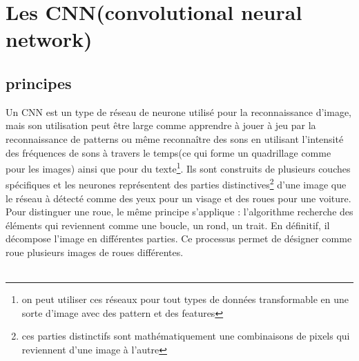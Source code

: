 \documentclass[openany,14pt,fleqn]{book} %
\begin{document}
\chapter{Les CNN(convolutional neural network)}
\section{principes}
Un CNN est un type de réseau de neurone utilisé pour la reconnaissance d'image, mais son utilisation peut être large comme apprendre à jouer à jeu par la reconnaissance de patterns ou même reconnaître des sons en utilisant l'intensité des fréquences de sons à travers le temps(ce qui forme un quadrillage comme pour les images) ainsi que pour du texte\footnote{on peut utiliser ces réseaux pour tout types de données transformable en une sorte d'image avec des pattern et des features}. Ils sont construits de plusieurs couches spécifiques et les neurones représentent des parties distinctives\footnote{ces parties distinctifs sont mathématiquement une combinaisons de pixels qui reviennent d'une image à l'autre} d'une image que le réseau à détecté comme des yeux pour un visage et des roues pour une voiture. Pour distinguer une roue, le même principe s'applique : l'algorithme recherche des éléments qui reviennent comme une boucle, un rond, un trait. En définitif, il décompose l'image en différentes parties. Ce processus permet de désigner comme roue plusieurs images de roues différentes.\\ \\
\end{document}
